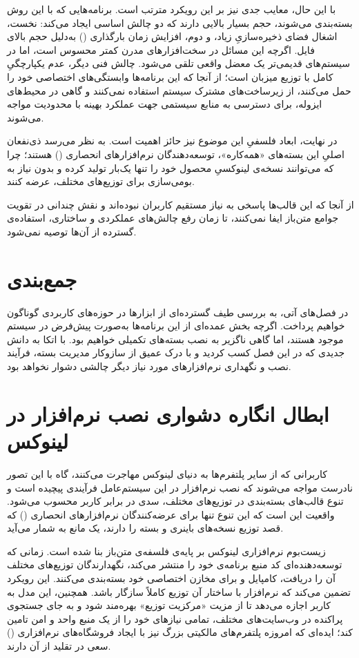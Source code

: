 با این حال، معایب جدی نیز بر این رویکرد مترتب است. برنامه‌هایی که با این روش بسته‌بندی می‌شوند، حجم بسیار بالایی دارند که دو چالش اساسی ایجاد می‌کند: نخست، اشغال فضای ذخیره‌سازیِ زیاد، و دوم، افزایش زمان بارگذاری () به‌دلیل حجم بالای فایل. اگرچه این مسائل در سخت‌افزارهای مدرن کمتر محسوس است، اما در سیستم‌های قدیمی‌تر یک معضل واقعی تلقی می‌شود. چالش فنی دیگر، عدم یکپارچگیِ کامل با توزیع میزبان است؛ از آنجا که این برنامه‌ها وابستگی‌های اختصاصی خود را حمل می‌کنند، از زیرساخت‌های مشترک سیستم استفاده نمی‌کنند و گاهی در محیط‌های ایزوله، برای دسترسی به منابع سیستمی جهت عملکرد بهینه با محدودیت مواجه می‌شوند.

در نهایت، ابعاد فلسفیِ این موضوع نیز حائز اهمیت است. به نظر می‌رسد ذی‌نفعان اصلیِ این بسته‌های «همه‌کاره»، توسعه‌دهندگان نرم‌افزارهای انحصاری () هستند؛ چرا که می‌توانند نسخه‌ی لینوکسیِ محصول خود را تنها یک‌بار تولید کرده و بدون نیاز به بومی‌سازی برای توزیع‌های مختلف، عرضه کنند.

از آنجا که این قالب‌ها پاسخی به نیاز مستقیم کاربران نبوده‌اند و نقش چندانی در تقویت جوامع متن‌باز ایفا نمی‌کنند، تا زمان رفع چالش‌های عملکردی و ساختاری، استفاده‌ی گسترده از آن‌ها توصیه نمی‌شود.

\section{جمع‌بندی}

در فصل‌های آتی، به بررسی طیف گسترده‌ای از ابزارها در حوزه‌های کاربردی گوناگون خواهیم پرداخت. اگرچه بخش عمده‌ای از این برنامه‌ها به‌صورت پیش‌فرض در سیستم موجود هستند، اما گاهی ناگزیر به نصب بسته‌های تکمیلی خواهیم بود. با اتکا به دانش جدیدی که در این فصل کسب کردید و با درک عمیق از سازوکار مدیریت بسته، فرآیند نصب و نگهداری نرم‌افزارهای مورد نیاز دیگر چالشی دشوار نخواهد بود.

\section{ابطال انگاره دشواری نصب نرم‌افزار در لینوکس}

کاربرانی که از سایر پلتفرم‌ها به دنیای لینوکس مهاجرت می‌کنند، گاه با این تصور نادرست مواجه می‌شوند که نصب نرم‌افزار در این سیستم‌عامل فرآیندی پیچیده است و تنوع قالب‌های بسته‌بندی در توزیع‌های مختلف، سدی در برابر کاربر محسوب می‌شود. واقعیت این است که این تنوع تنها برای عرضه‌کنندگان نرم‌افزارهای انحصاری () که قصد توزیع نسخه‌های باینری و بسته را دارند، یک مانع به شمار می‌آید.

زیست‌بوم نرم‌افزاری لینوکس بر پایه‌ی فلسفه‌ی متن‌باز بنا شده است. زمانی که توسعه‌دهنده‌ای کد منبع برنامه‌ی خود را منتشر می‌کند، نگهدارندگان توزیع‌های مختلف آن را دریافت، کامپایل و برای مخازن اختصاصی خود بسته‌بندی می‌کنند. این رویکرد تضمین می‌کند که نرم‌افزار با ساختار آن توزیع کاملاً سازگار باشد. همچنین، این مدل به کاربر اجازه می‌دهد تا از مزیت «مرکزیت توزیع» بهره‌مند شود و به جای جستجوی پراکنده در وب‌سایت‌های مختلف، تمامی نیازهای خود را از یک منبع واحد و امن تامین کند؛ ایده‌ای که امروزه پلتفرم‌های مالکیتی بزرگ نیز با ایجاد فروشگاه‌های نرم‌افزاری () سعی در تقلید از آن دارند.

